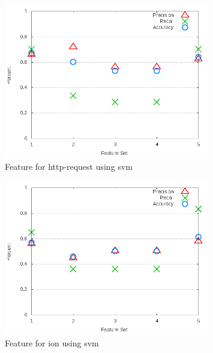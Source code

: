 \begin{figure}[!t]
\centering
\includegraphics[width=0.8\textwidth]{images/svm/test_3/http-request_sample_range.png}
\caption{Feature for http-request using \gls{svm}}
\label{fig:test_3_http-request_svm}
\end{figure}

\clearpage
\begin{figure}[!t]
\centering
\includegraphics[width=0.8\textwidth]{images/svm/test_3/ion_sample_range.png}
\caption{Feature for ion using \gls{svm}}
\label{fig:test_3_ion_svm}
\end{figure}

